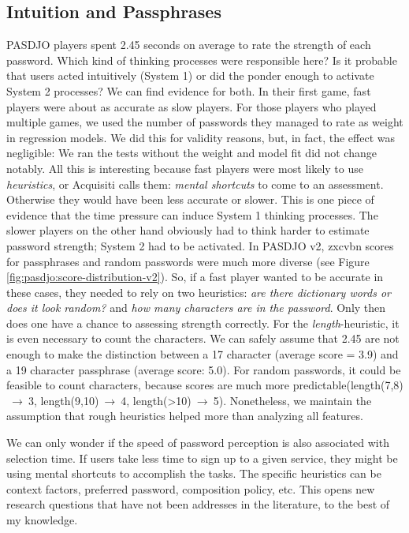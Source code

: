 \subsection{Intuition and Passphrases}
PASDJO players spent 2.45 seconds on average to rate the strength of each password. Which kind of thinking processes were responsible here? Is it probable that users acted intuitively (System 1) or did the ponder enough to activate System 2 processes? We can find evidence for both. 
In their first game, fast players were about as accurate as slow players. For those players who played multiple games, we used the number of passwords they managed to rate as weight in regression models. We did this for validity reasons, but, in fact, the effect was negligible: We ran the tests without the weight and model fit did not change notably. All this is interesting because fast players were most likely to use \textit{heuristics}, or Acquisiti \etal calls them: \textit{mental shortcuts} to come to an assessment. Otherwise they would have been less accurate or slower. This is one piece of evidence that the time pressure can induce System 1 thinking processes. The slower players on the other hand obviously had to think harder to estimate password strength; System 2 had to be activated. 
In PASDJO v2, zxcvbn scores for passphrases and random passwords were much more diverse (see Figure \ref{fig:pasdjo:score-distribution-v2}). So, if a fast player wanted to be accurate in these cases, they needed to rely on two heuristics: \textit{are there dictionary words or does it look random?} and \textit{how many characters are in the password}. Only then does one have a chance to assessing strength correctly. For the \textit{length}-heuristic, it is even necessary to count the characters. We can safely assume that 2.45 are not enough to make the distinction between a 17 character (average score = 3.9) and a 19 character passphrase (average score: 5.0). For random passwords, it could be feasible to count characters, because scores are much more predictable(length(7,8)$~\rightarrow~$3, length(9,10)$~\rightarrow~$4, length(>10)$~\rightarrow~$5). Nonetheless, we maintain the assumption that rough heuristics helped more than analyzing all features. 

We can only wonder if the speed of password perception is also associated with selection time. If users take less time to sign up to a given service, they might be using mental shortcuts to accomplish the tasks. The specific heuristics can be context factors, preferred password, composition policy, etc. This opens new research questions that have not been addresses in the literature, to the best of my knowledge. 

